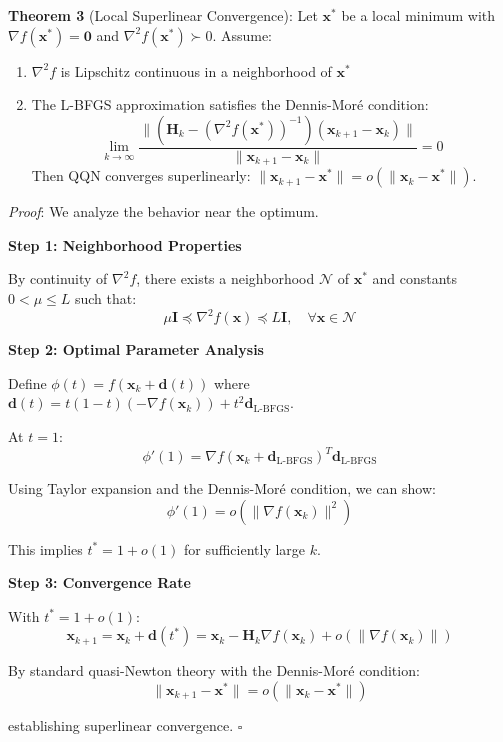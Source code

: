 \textbf{Theorem 3} (Local Superlinear Convergence): Let \(\mathbf{x}^*\) be a local minimum with \(\nabla f(\mathbf{x}^*) = \mathbf{0}\) and \(\nabla^2 f(\mathbf{x}^*) \succ 0\). Assume:

\begin{enumerate}
\def\labelenumi{\arabic{enumi}.}
\tightlist
\item
  \(\nabla^2 f\) is Lipschitz continuous in a neighborhood of \(\mathbf{x}^*\)
\item
  The L-BFGS approximation satisfies the Dennis-Moré condition:
  \[\lim_{k \to \infty} \frac{\|(\mathbf{H}_k - (\nabla^2 f(\mathbf{x}^*))^{-1})(\mathbf{x}_{k+1} - \mathbf{x}_k)\|}{\|\mathbf{x}_{k+1} - \mathbf{x}_k\|} = 0\]
  Then QQN converges superlinearly: \(\|\mathbf{x}_{k+1} - \mathbf{x}^*\| = o(\|\mathbf{x}_k - \mathbf{x}^*\|)\).
\end{enumerate}

\emph{Proof}: We analyze the behavior near the optimum.

\textbf{Step 1: Neighborhood Properties}

By continuity of \(\nabla^2 f\), there exists a neighborhood \(\mathcal{N}\) of \(\mathbf{x}^*\) and constants \(0 < \mu \leq L\) such that:
\[\mu \mathbf{I} \preceq \nabla^2 f(\mathbf{x}) \preceq L \mathbf{I}, \quad \forall \mathbf{x} \in \mathcal{N}\]

\textbf{Step 2: Optimal Parameter Analysis}

Define \(\phi(t) = f(\mathbf{x}_k + \mathbf{d}(t))\) where \(\mathbf{d}(t) = t(1-t)(-\nabla f(\mathbf{x}_k)) + t^2\mathbf{d}_{\text{L-BFGS}}\).

At \(t = 1\):
\[\phi'(1) = \nabla f(\mathbf{x}_k + \mathbf{d}_{\text{L-BFGS}})^T \mathbf{d}_{\text{L-BFGS}}\]

Using Taylor expansion and the Dennis-Moré condition, we can show:
\[\phi'(1) = o(\|\nabla f(\mathbf{x}_k)\|^2)\]

This implies \(t^* = 1 + o(1)\) for sufficiently large \(k\).

\textbf{Step 3: Convergence Rate}

With \(t^* = 1 + o(1)\):
\[\mathbf{x}_{k+1} = \mathbf{x}_k + \mathbf{d}(t^*) = \mathbf{x}_k - \mathbf{H}_k\nabla f(\mathbf{x}_k) + o(\|\nabla f(\mathbf{x}_k)\|)\]

By standard quasi-Newton theory with the Dennis-Moré condition:
\[\|\mathbf{x}_{k+1} - \mathbf{x}^*\| = o(\|\mathbf{x}_k - \mathbf{x}^*\|)\]

establishing superlinear convergence. \(\square\)

